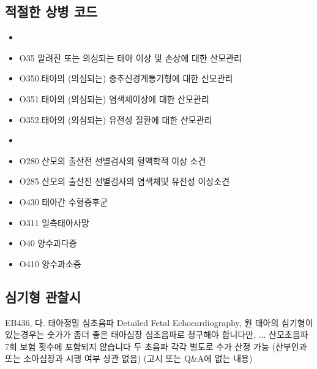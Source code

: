 \subsection{적절한 상병 코드}
	\begin{itemize}\tightlist
	\item {}
	\item O35 알려진 또는 의심되는 태아 이상 및 손상에 대한 산모관리
	\item O350.태아의 (의심되는) 중추신경계통기형에 대한 산모관리
	\item O351.태아의 (의심되는) 염색체이상에 대한 산모관리
	\item O352.태아의 (의심되는) 유전성 질환에 대한 산모관리
	\item {}
	\item O280 산모의 출산전 선별검사의 혈액학적 이상 소견
	\item O285 산모의 출산전 선별검사의 염색체및 유전성 이상소견
	\item O430 태아간 수혈증후군
	\item O311 일측태아사망
	\item O40 양수과다증
	\item O410 양수과소증
	\end{itemize}
\prezi{\clearpage}	
\subsection{심기형 관찰시}
EB436, 다.  태아정밀 심초음파 Detailed Fetal Echocardiography,  원
태아의 심기형이 있는경우는 숫가가 좀더 좋은 태아심장 심초음파로 청구해야  합니다만, ...
산모초음파 7회 보험 횟수에 포함되지 않습니다 
두 초음파 각각 별도로 수가 산정 가능 (산부인과 또는 소아심장과 시행 여부 상관 없음) (고시 또는 Q\&A에 없는 내용)
